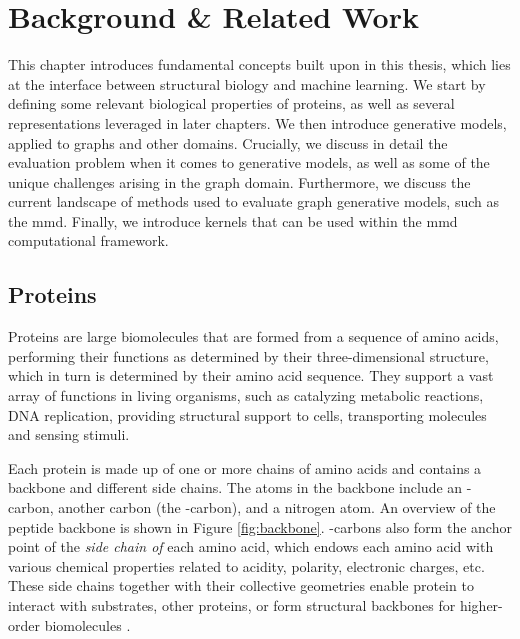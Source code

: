 
\chapter{Background \& Related Work}\label{chap:background}


This chapter introduces fundamental concepts built upon in this thesis, which
lies at the interface between structural biology and machine learning. We start
by defining some relevant biological properties of proteins, as well as several
representations leveraged in later chapters. We then introduce generative
models, applied to graphs and other domains. Crucially, we discuss in detail the
evaluation problem when it comes to generative models, as well as some of the
unique challenges arising in the graph domain. Furthermore, we discuss the
current landscape of methods used to evaluate graph generative models, such as
the \acrfull{mmd}. Finally, we introduce kernels that can be used
within the \acrshort{mmd} computational framework.

\section{Proteins}\label{sec:proteins}

Proteins are large biomolecules that are formed from a sequence of amino acids,
performing their functions as determined by their three-dimensional structure,
which in turn is determined by their amino acid sequence. They support a vast array of
functions in living organisms, such as catalyzing metabolic reactions, DNA
replication, providing structural support to cells, transporting molecules and
sensing stimuli.

Each protein is made up of one or more chains of amino acids and contains a
backbone and different side chains. The atoms in the backbone include an
\textalpha{}-carbon, another carbon (the \textbeta{}-carbon), and a nitrogen
atom. An overview of the peptide backbone is shown in Figure \ref{fig:backbone}.
\textalpha{}-carbons also form the anchor point of the \emph{side chain of} each
amino acid, which endows each amino acid with various chemical properties
related to acidity, polarity, electronic charges, etc. These side chains
together with their collective geometries enable protein to interact with
substrates, other proteins, or form structural backbones for higher-order
biomolecules \citep{o20102}.

